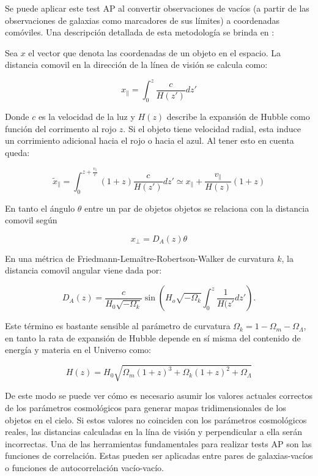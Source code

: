 \documentclass[preprint]{aastex62}
\begin{document}
  Se puede aplicar este test AP al convertir observaciones de
  vacíos (a partir de las observaciones de galaxias como marcadores de sus límites) a coordenadas
  comóviles. Una descripción detallada de esta metodología se brinda en \citet{Hamaus2015}:

  Sea $x$ el vector que denota las coordenadas de un objeto en el espacio. La distancia comovil en la
  dirección de la línea de visión se calcula como:

  \begin{equation}
    x_{\parallel} = \int _0 ^z \frac{c}{H(z')}dz'
  \end{equation}

  Donde $c$ es la velocidad de la luz y $H(z)$ describe la expansión de Hubble como función del
  corrimento al rojo $z$. Si el objeto tiene velocidad radial, esta induce un corrimiento adicional
  hacia el rojo o hacia el azul. Al tener esto en cuenta queda:

  \begin{equation}
    \tilde{x}_{\parallel} = \int _0 ^{z + \frac{v_\parallel}{c}}(1+z) \frac{c}{H(z')}dz'
    \simeq x_\parallel + \frac{v_\parallel}{H(z)}(1+z)
  \end{equation}

  En tanto el ángulo $\theta$  entre un par de objetos objetos se relaciona con la distancia comovil según

  \begin{equation}
    x_{\perp} = D_A(z)\theta
  \end{equation}
  
  En una métrica de  Friedmann-Lema\^itre-Robertson-Walker de curvatura $k$, la distancia
  comovil angular viene dada por:
  
  \begin{equation}
    D_A(z) = \frac{c}{H_0\sqrt{-\Omega_k}} \sin \left( H_o\sqrt{-\Omega_k}
    \int_0^z \frac{1}{H(z'} dz' \right).
  \end{equation}
  
  Este término es bastante sensible al parámetro de curvatura
  $\Omega_k = 1 - \Omega_m - \Omega_\Lambda$, en tanto la rata de expansión de Hubble
  depende en sí misma del contenido de energía y materia en el Universo como:

  \begin{equation}
    H(z) = H_0 \sqrt{ \Omega_m(1+z)^3 + \Omega_k(1+z)^2+\Omega_\Lambda}
  \end{equation}

  De este modo se puede ver cómo es necesario asumir los valores actuales correctos de los
  parámetros cosmológicos para generar mapas tridimensionales de los objetos en el cielo. Si
  estos valores no coinciden con los parámetros
  cosmológicos reales, las distancias calculadas en la lína de visión y perpendicular a ella serán
  incorrectas. Una de las herramientas fundamentales para realizar tests AP son las funciones
  de correlación. Estas pueden ser aplicadas entre pares de galaxias-vacíos o funciones de
  autocorrelación vacío-vacío.
  
\end{document}
